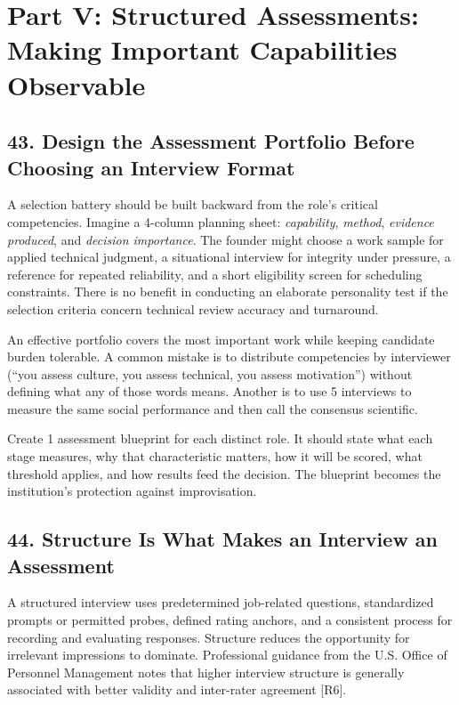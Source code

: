 \section*{Part V: Structured Assessments: Making Important Capabilities Observable}

\subsection*{43. Design the Assessment Portfolio Before Choosing an Interview Format}

A selection battery should be built backward from the role's critical competencies. Imagine a 4-column planning sheet: \textit{capability}, \textit{method}, \textit{evidence produced}, and \textit{decision importance}. The founder might choose a work sample for applied technical judgment, a situational interview for integrity under pressure, a reference for repeated reliability, and a short eligibility screen for scheduling constraints. There is no benefit in conducting an elaborate personality test if the selection criteria concern technical review accuracy and turnaround.

An effective portfolio covers the most important work while keeping candidate burden tolerable. A common mistake is to distribute competencies by interviewer (``you assess culture, you assess technical, you assess motivation'') without defining what any of those words means. Another is to use 5 interviews to measure the same social performance and then call the consensus scientific.

Create 1 assessment blueprint for each distinct role. It should state what each stage measures, why that characteristic matters, how it will be scored, what threshold applies, and how results feed the decision. The blueprint becomes the institution's protection against improvisation.

\subsection*{44. Structure Is What Makes an Interview an Assessment}

A structured interview uses predetermined job-related questions, standardized prompts or permitted probes, defined rating anchors, and a consistent process for recording and evaluating responses. Structure reduces the opportunity for irrelevant impressions to dominate. Professional guidance from the U.S. Office of Personnel Management notes that higher interview structure is generally associated with better validity and inter-rater agreement [R6].

